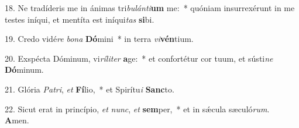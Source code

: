 18. Ne tradíderis me in ánimas tri\textit{bu}\textit{lán}\textit{ti}\textbf{um} me:~*  quóniam insurrexérunt in me testes iníqui, et mentíta est iníqui\textit{tas} \textbf{si}bi.\

19. Credo vidé\textit{re} \textit{bo}\textit{na} \textbf{Dó}mini~*  in terra \textit{vi}\textbf{vén}tium.\

20. Exspécta Dóminum, vi\textit{rí}\textit{li}\textit{ter} \textbf{a}ge:~*  et confortétur cor tuum, et sústi\textit{ne} \textbf{Dó}minum.\

21. Glória \textit{Pa}\textit{tri}, \textit{et} \textbf{Fí}lio,~*  et Spirítu\textit{i} \textbf{Sanc}to.\

22. Sicut erat in princípio, \textit{et} \textit{nunc}, \textit{et} \textbf{sem}per,~*  et in sǽcula sæculó\textit{rum}. \textbf{A}men.\

